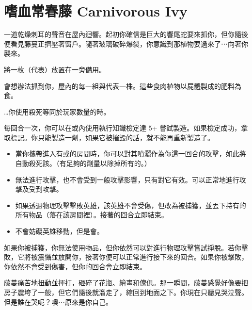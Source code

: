 
\chapter{嗜血常春藤 Carnivorous Ivy}

\begin{HauntStory}
	一道乾燥刺耳的聲音在屋內迴響。起初你確信是巨大的響尾蛇要來抓你，但你隨後便看見藤蔓正擠壓著窗戶。隨著玻璃破碎爆裂，你意識到那植物要過來了⋯向著你襲來。
\end{HauntStory}

將一枚（代表）放置在一旁備用。

會想辦法抓到你，屋內的每一組與代表一株。這些食肉植物以屍體製成的肥料為食。

…你使用殺死等同於玩家數量的時。

每回合一次，你可以在或內使用執行知識檢定達 5+ 嘗試製造。如果檢定成功，拿取標記。你只能製造一劑，如果它被摧毀的話，就不能再重新製造了。

\vfill\null\pagebreak

\vspace*{-1em}
\begin{itemize}
	\item 當你攜帶進入有或的房間時，你可以對其噴灑作為你這一回合的攻擊，如此將自動殺死該。（有足夠的劑量以除掉所有的。）
	\item {}無法進行攻擊，也不會受到一般攻擊影響，只有對它有效。可以正常地進行攻擊及受到攻擊。
	\item 如果透過物理攻擊擊敗英雄，該英雄不會受傷，但改為被捕獲，並丟下持有的所有物品（落在該房間裡）。接著的回合立即結束。
	\item {}不會妨礙英雄移動，但是會。
\end{itemize}

如果你被捕獲，你無法使用物品，但你依然可以對進行物理攻擊嘗試掙脫。若你擊敗，它將被震懾並放開你，接著你便可以正常進行接下來的回合。如果你被擊敗，你依然不會受到傷害，但你的回合會立即結束。

\begin{HauntStory}
	藤蔓痛苦地扭動並揮打，砸碎了花瓶、繪畫和傢俱。那一瞬間，藤蔓感覺好像要把房子震垮了一般，但它們隨後就溜走了，縮回到地面之下。你現在只聽見哭泣聲。但是誰在哭呢？噢⋯原來是你自己。
\end{HauntStory}
